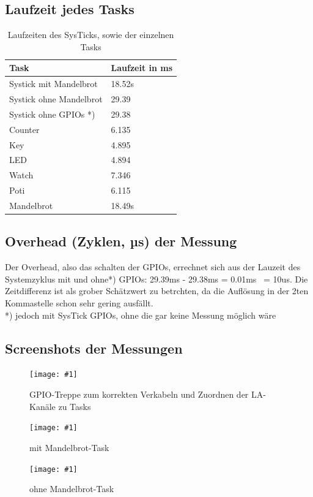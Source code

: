 \documentclass{article}
\newcommand{\bild}[3]{\begin{figure}[h!]		\begin{center}			\texttt{[image: \#1]}			\caption{#2}		\end{center}	\end{figure}}
\begin{document}
\subsection{Laufzeit jedes Tasks}
	\begin{table}[h!]
		\begin{center}		
			\begin{tabular}{ l | l }	 %
				Task & Laufzeit in ms \\ \hline
				Systick mit Mandelbrot	& 18.52s \\ \hline
				Systick ohne Mandelbrot	& 29.39 	\\ \hline
				Systick ohne GPIOs *)	& 29.38 \\ \hline
				Counter	& 6.135 \\ \hline
				Key& 4.895 \\ \hline
				LED	& 4.894 \\ \hline
				Watch	& 7.346 \\ \hline
				Poti	& 6.115 \\ \hline
				Mandelbrot	& 18.49s \\ %
			\end{tabular}
			\caption{Laufzeiten des SysTicks, sowie der einzelnen Tasks}
		\end{center}		
	\end{table}

		


\subsection{Overhead (Zyklen, µs) der Messung}
Der Overhead, also das schalten der GPIOs, errechnet sich aus der Lauzeit des Systemzyklus mit und ohne*) GPIOs: 29.39ms - 29.38ms = 0.01ms ~= 10us. Die Zeitdifferenz ist als grober Schätzwert zu betrchten, da die Auflösung in der 2ten Kommastelle schon sehr gering ausfällt. \\
	*) jedoch mit SysTick GPIOs, ohne die gar keine Messung möglich wäre

\subsection{Screenshots der Messungen }
\bild{tryGPIO}{GPIO-Treppe zum korrekten Verkabeln und Zuordnen der LA-Kanäle zu Tasks}{width=\textwidth}
\bild{02_mitMandelbrot}{mit Mandelbrot-Task}{width=\textwidth}
\bild{03_ohneMandelbrot_time}{ohne Mandelbrot-Task}{width=\textwidth}
\end{document}

